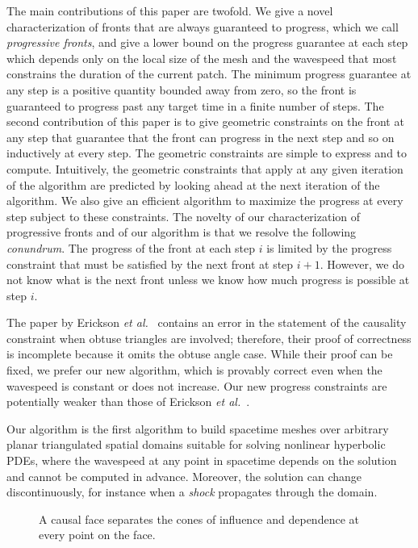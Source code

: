 \documentclass[twocolumn]{article}
\newif\iffig
\def\etal{\textsl{et al.}}
\begin{document}
The main contributions of this paper are twofold.  We give a novel
characterization of fronts that are always guaranteed to progress,
which we call \emph{progressive fronts}, and give a lower bound on the
progress guarantee at each step which depends only on the local size
of the mesh and the wavespeed that most constrains the duration of the
current patch.  The minimum progress guarantee at any step is a
positive quantity bounded away from zero, so the front is guaranteed
to progress past any target time in a finite number of steps.  The
second contribution of this paper is to give geometric constraints on
the front at any step that guarantee that the front can progress in
the next step and so on inductively at every step.  The geometric
constraints are simple to express and to compute.  Intuitively, the
geometric constraints that apply at any given iteration of the
algorithm are predicted by looking ahead at the next iteration of the
algorithm.  We also give an efficient algorithm to maximize the
progress at every step subject to these constraints.  The novelty of
our characterization of progressive fronts and of our algorithm is
that we resolve the following \emph{conundrum}.  The progress of the
front at each step $i$ is limited by the progress constraint that must
be satisfied by the next front at step $i+1$.  However, we do not know
what is the next front unless we know how much progress is possible at
step $i$.

The paper by Erickson \etal{}~\cite{erickson02building} contains an
error in the statement of the causality constraint when obtuse
triangles are involved; therefore, their proof of correctness is
incomplete because it omits the obtuse angle case.  While their proof
can be fixed, we prefer our new algorithm, which is provably correct
even when the wavespeed is constant or does not increase.  Our new
progress constraints are potentially weaker than those of Erickson
\etal{}~\cite{erickson02building}.

Our algorithm is the first algorithm to build spacetime meshes over
arbitrary planar triangulated spatial domains suitable for solving
nonlinear hyperbolic PDEs, where the wavespeed at any point in
spacetime depends on the solution and cannot be computed in advance.
Moreover, the solution can change discontinuously, for instance when a
\emph{shock} propagates through the domain.

\begin{figure}\centering\sf
\iffig\texttt{[image: fig/doublecone]}\fi
\caption{A causal face separates the cones of influence and dependence
at every point on the face.}
\label{fig:causalface}
\end{figure}
\end{document}
